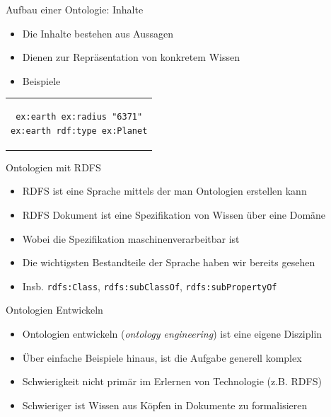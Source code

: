 \documentclass{beamer}
\begin{document}
\begin{frame}[fragile]{Aufbau einer Ontologie: Inhalte}
	
	\begin{itemize}
		\item Die Inhalte bestehen aus Aussagen
		\item Dienen zur Repräsentation von konkretem Wissen
		\item Beispiele
	\end{itemize}	
	
	\begin{center}
		\begin{tabular}{c}
			\begin{lstlisting}
ex:earth ex:radius "6371"
ex:earth rdf:type ex:Planet
			\end{lstlisting}
		\end{tabular}
	\end{center}	
	
\end{frame}

\begin{frame}{Ontologien mit RDFS}
	
	\begin{itemize}
		\item RDFS ist eine Sprache mittels der man Ontologien erstellen kann
		\item RDFS Dokument ist eine Spezifikation von Wissen über eine Domäne
		\item Wobei die Spezifikation maschinenverarbeitbar ist
		\item Die wichtigsten Bestandteile der Sprache haben wir bereits gesehen
		\item Insb. \texttt{rdfs:Class}, \texttt{rdfs:subClassOf}, \texttt{rdfs:subPropertyOf}
	\end{itemize}
	
\end{frame}

\begin{frame}{Ontologien Entwickeln}
	
	\begin{itemize}
		\item Ontologien entwickeln (\emph{ontology engineering}) ist eine eigene Disziplin
		\item Über einfache Beispiele hinaus, ist die Aufgabe generell komplex
		\item Schwierigkeit nicht primär im Erlernen von Technologie (z.B. RDFS)
		\item Schwieriger ist Wissen aus Köpfen in Dokumente zu formalisieren
	\end{itemize}
	
\end{frame}
\end{document}
